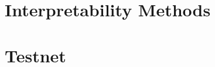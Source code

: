 % 

\chapter{Interpretability Methods}
% 
% 
% 
% 
% 

% 

% 
% 

% 
% 
% 

% 
% 
% 
% 
% 
% 
% 
% 


\chapter{Testnet}


% 
% 
% 

% 
% 
% 
% 
% 
% 

